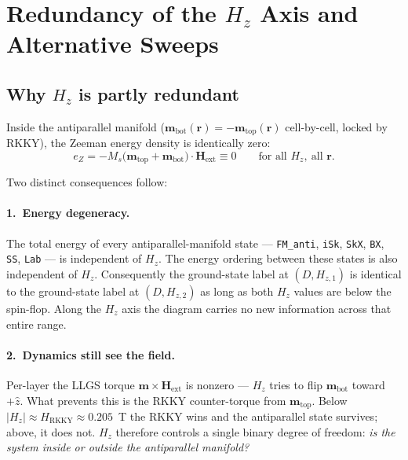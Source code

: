 \documentclass[11pt,a4paper]{article}
\newcommand{\mb}[1]{\mathbf{#1}}
\newcommand{\zhat}{\hat{z}}
\newcommand{\Ms}{M_s}
\newcommand{\HRKKY}{H_{\text{RKKY}}}
\begin{document}
\section{Redundancy of the $H_z$ Axis and Alternative Sweeps}
\label{sec:Hz_redundancy}

\subsection{Why $H_z$ is partly redundant}

Inside the antiparallel manifold
($\mb{m}_{\text{bot}}(\mb{r}) = -\mb{m}_{\text{top}}(\mb{r})$
cell-by-cell, locked by RKKY), the Zeeman energy density
is identically zero:
%
\begin{equation}
e_Z = -\Ms \bigl(\mb{m}_{\text{top}}
    + \mb{m}_{\text{bot}}\bigr) \cdot \mb{H}_{\text{ext}}
    \equiv 0
\qquad \text{for all } H_z,\ \text{all } \mb{r}.
\end{equation}

Two distinct consequences follow:

\paragraph{1.\ Energy degeneracy.}
The total energy of every antiparallel-manifold state ---
\texttt{FM\_anti}, \texttt{iSk}, \texttt{SkX},
\texttt{BX}, \texttt{SS}, \texttt{Lab} --- is independent
of $H_z$. The energy ordering between these states is also
independent of $H_z$. Consequently the ground-state label
at $(D, H_{z,1})$ is identical to the ground-state label
at $(D, H_{z,2})$ as long as both $H_z$ values are below
the spin-flop. Along the $H_z$ axis the diagram carries no
new information across that entire range.

\paragraph{2.\ Dynamics still see the field.}
Per-layer the LLGS torque $\mb{m} \times \mb{H}_{\text{ext}}$
is nonzero --- $H_z$ tries to flip $\mb{m}_{\text{bot}}$
toward $+\zhat$. What prevents this is the RKKY
counter-torque from $\mb{m}_{\text{top}}$. Below
$|H_z| \approx \HRKKY \approx 0.205$~T the RKKY wins and
the antiparallel state survives; above, it does not.
$H_z$ therefore controls a single binary degree of freedom:
\emph{is the system inside or outside the antiparallel
manifold?}
\end{document}

